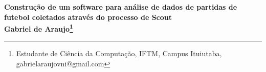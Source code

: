\begin{center}
\textbf{Construção de um software para análise de dados de partidas de futebol coletados através do processo de Scout\\
Gabriel de Araujo\footnote[1]{Estudante de Ciência da Computação, IFTM, Campus Ituiutaba, gabrielaraujovni@gmail.com}}
\end{center}